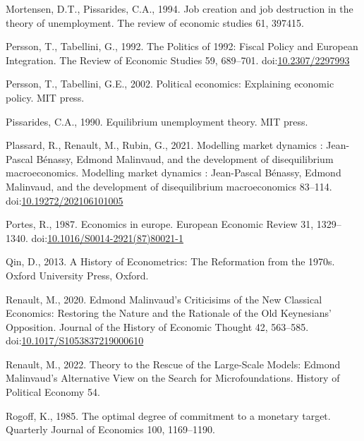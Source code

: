 \documentclass[
  12pt,
  onecolumn]{article}
\newlength{\cslhangindent}
\newlength{\cslentryspacingunit} %
\newenvironment{CSLReferences}[2] %
 {%
  \setlength{\parindent}{0pt}
  \ifodd #1
  \let\oldpar\par
  \def\par{\hangindent=\cslhangindent\oldpar}
  \fi
  \setlength{\parskip}{#2\cslentryspacingunit}
 }%
 {}
\begin{document}
\begin{CSLReferences}{1}{0}
\leavevmode{}%
Mortensen, D.T., Pissarides, C.A., 1994. Job creation and job
destruction in the theory of unemployment. The review of economic
studies 61, 397415.

\leavevmode{}%
Persson, T., Tabellini, G., 1992. The {Politics} of 1992: {Fiscal
Policy} and {European Integration}. The Review of Economic Studies 59,
689--701. doi:\href{https://doi.org/10.2307/2297993}{10.2307/2297993}

\leavevmode{}%
Persson, T., Tabellini, G.E., 2002. Political economics: Explaining
economic policy. {MIT press}.

\leavevmode{}%
Pissarides, C.A., 1990. Equilibrium unemployment theory. MIT press.

\leavevmode{}%
Plassard, R., Renault, M., Rubin, G., 2021. Modelling market dynamics :
{Jean-Pascal Bénassy}, {Edmond Malinvaud}, and the development of
disequilibrium macroeconomics. Modelling market dynamics : Jean-Pascal
Bénassy, Edmond Malinvaud, and the development of disequilibrium
macroeconomics 83--114.
doi:\href{https://doi.org/10.19272/202106101005}{10.19272/202106101005}

\leavevmode{}%
Portes, R., 1987. Economics in europe. European Economic Review 31,
1329--1340.
doi:\href{https://doi.org/10.1016/S0014-2921(87)80021-1}{10.1016/S0014-2921(87)80021-1}

\leavevmode{}%
Qin, D., 2013. {A History of Econometrics: The Reformation from the
1970s}. {Oxford University Press}, {Oxford}.

\leavevmode{}%
Renault, M., 2020. Edmond {Malinvaud}'s {Criticisims} of the {New
Classical Economics}: {Restoring} the {Nature} and the {Rationale} of
the {Old Keynesians}' {Opposition}. Journal of the History of Economic
Thought 42, 563--585.
doi:\href{https://doi.org/10.1017/S1053837219000610}{10.1017/S1053837219000610}

\leavevmode{}%
Renault, M., 2022. Theory to the {Rescue} of the {Large-Scale Models}:
{Edmond Malinvaud}'s {Alternative View} on the {Search} for
{Microfoundations}. History of Political Economy 54.

\leavevmode{}%
Rogoff, K., 1985. The optimal degree of commitment to a monetary target.
Quarterly Journal of Economics 100, 1169--1190.


\end{CSLReferences}
\end{document}
